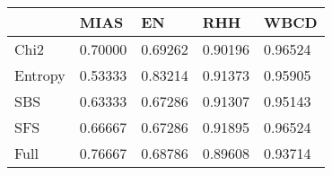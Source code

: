 \begin{tabular}{|l|l|l|l|l|}
\toprule
{} &    MIAS &      EN &     RHH &    WBCD \\
\midrule
Chi2    & 0.70000 & 0.69262 & 0.90196 & 0.96524 \\
Entropy & 0.53333 & 0.83214 & 0.91373 & 0.95905 \\
SBS     & 0.63333 & 0.67286 & 0.91307 & 0.95143 \\
SFS     & 0.66667 & 0.67286 & 0.91895 & 0.96524 \\
Full    & 0.76667 & 0.68786 & 0.89608 & 0.93714 \\
\bottomrule
\end{tabular}
